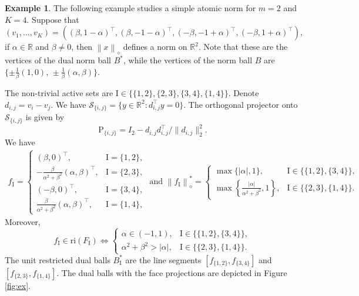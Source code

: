 \documentclass[12pt]{amsart}
\numberwithin{equation}{section}
\numberwithin{equation}{section}
\theoremstyle{definition}
\newtheorem{example}[thm]{Example}
\newcommand{\R}{\mathbb{R}}
\newcommand{\I}{\mathrm{I}}
\newcommand{\poly}[1]{\left\|#1\right\|_\diamond}
\newcommand{\polyd}[1]{\left\|#1\right\|^\ast_\diamond}
\newcommand{\PP}{\mathrm{P}}
\renewcommand{\SS}{\mathcal{S}}
\begin{document}
\begin{example}\label{ex:simple}
The following example studies a simple atomic norm for $m=2$ and $K=4$. Suppose that 
\[
(v_1,\ldots,v_K) = \left((\beta,1-\alpha)^\top,
(\beta,-1-\alpha)^\top,
(-\beta,-1+\alpha)^\top,(-\beta,1+\alpha)^\top\right),
\]
if $\alpha\in\R$ and $\beta\neq 0$, then $\poly{x}$ defines a norm on $\R^2$. 
Note that these are the vertices of the dual norm ball $B^\ast$,
while the vertices of the norm ball $B$ are $\{\pm\frac1\beta(1,0),\,\pm\frac1\beta(\alpha,\beta)\}$.

The non-trivial active sets are $\I\in \{\{1,2\}, \{2,3\}, \{3,4\},\{1,4\}\}$. Denote $d_{i,j}=v_i-v_j$. We have $\SS_{\{i,j\}} = \{y\in\R^2\colon d_{i,j}^\top y=0\}$. The orthogonal projector onto $\SS_{\{i,j\}}$ is given by 
\[
\PP_{\{i,j\}} = I_2 - d_{i,j}d_{i,j}^\top / \|d_{i,j}\|_2^2. 
\]
We have 
\begin{align*}
    f_\I = \begin{cases}
        (\beta,0)^\top, & \I=\{1,2\},\\
         -\frac{\beta}{\alpha^2+\beta^2} (\alpha,\beta)^\top, & \I=\{2,3\},\\
            (-\beta,0)^\top, & \I=\{3,4\},\\
         \frac{\beta}{\alpha^2+\beta^2} (\alpha,\beta)^\top, & \I=\{1,4\},
    \end{cases}
    \mbox{ and }
    \polyd{f_\I} = \begin{cases}
       \max\{|\alpha|,1\}, & \I\in\{ \{1,2\},\{3,4\}\},\\
         \displaystyle\max\left\{\frac{|\alpha|}{\alpha^2+\beta^2},1\right\}, & \I\in\{\{2,3\},\{1,4\}\}.
    \end{cases}
\end{align*}
%
Moreover,
\[
f_\I\in\mathrm{ri}(F_\I) \iff \begin{cases}
    \alpha\in(-1,1), & \I\in\{ \{1,2\},\{3,4\}\},\\
    \alpha^2+\beta^2>|\alpha|, & \I\in\{\{2,3\},\{1,4\}\}.
\end{cases}
\]
%
The unit restricted dual balls $B_{\I}^\ast$ are the line segments $[f_{\{1,2\}},f_{\{3,4\}}]$ and $[f_{\{2,3\}},f_{\{1,4\}}]$.
The dual balls with the face projections are depicted in Figure \ref{fig:ex}.


\newcommand{\drawDualAndShadows}[3]{%
  \begingroup
    \def\a{#2}\def\b{#3}%
    \pgfmathsetmacro{\Rx}{1.7}%
    \pgfmathsetmacro{\Ry}{4.1}%

}
\end{example}
\end{document}
